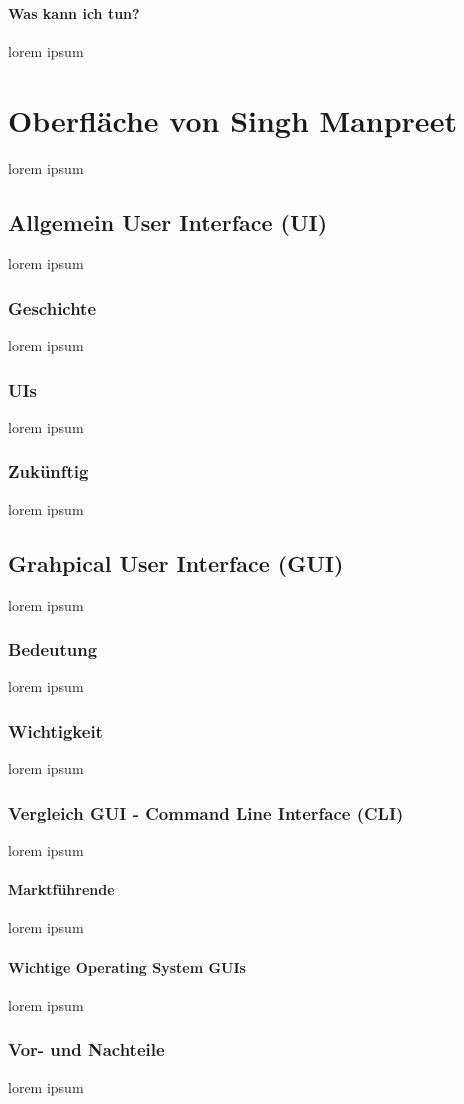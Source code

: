 \documentclass[10pt,a4paper]{report}
\begin{document}
\paragraph{Was kann ich tun?}
lorem ipsum
\section{Oberfläche von Singh Manpreet}
lorem ipsum
\subsection{Allgemein User Interface (UI)}
lorem ipsum
\subsubsection{Geschichte}
lorem ipsum
\subsubsection{UIs}
lorem ipsum 
\subsubsection{Zukünftig}
lorem ipsum 
\subsection{Grahpical User Interface (GUI)}
lorem ipsum
\subsubsection{Bedeutung}
lorem ipsum
\subsubsection{Wichtigkeit}
lorem ipsum
\subsubsection{Vergleich GUI - Command Line Interface (CLI)}
lorem ipsum
\paragraph{Marktführende}
lorem ipsum
\paragraph{Wichtige Operating System GUIs}
lorem ipsum
\subsubsection{Vor- und Nachteile}
lorem ipsum
\end{document}
